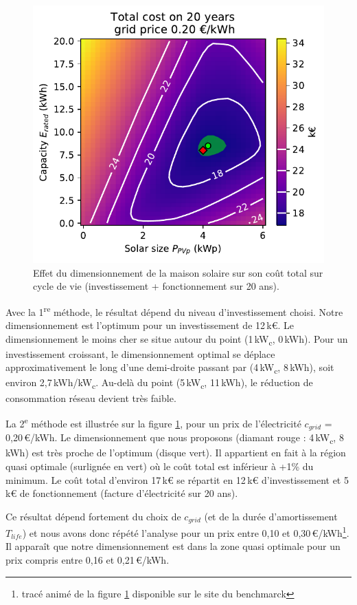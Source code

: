 \documentclass[a4paper,10pt,twocolumn]{article}
\newcommand\tsp[1]{\textsuperscript{#1}}
\newcommand\sub[1]{\textsubscript{#1}}
\newcommand\kWc{kW\sub{c}{}} %
\begin{document}
\begin{figure}[!ht]
  \begin{center}
	  \includegraphics[width=0.8\columnwidth]{figures/Total_cost_map_grid020.pdf}
  \end{center}

  \caption{Effet du dimensionnement de la maison solaire sur son coût total sur cycle de vie
  (investissement + fonctionnement sur 20 ans).
  }
  \label{fig:cost_tot}
\end{figure}

Avec la 1\tsp{re} méthode, le résultat dépend du niveau d'investissement choisi.
Notre dimensionnement est l'optimum pour un investissement de 12\,k€.
Le dimensionnement le moins cher se situe autour du point
(1\,\kWc, 0\,kWh). Pour un investissement croissant,
le dimensionnement optimal se déplace approximativement le long
d'une demi-droite passant par (4\,\kWc, 8\,kWh), soit environ
2,7\,kWh/\kWc.
Au-delà du point (5\,\kWc, 11\,kWh), le réduction de consommation réseau devient très faible.

La 2\tsp{e} méthode est illustrée sur la figure \ref{fig:cost_tot},
pour un prix de l'électricité $c_{grid}$ = 0,20\,€/kWh.
Le dimensionnement que nous proposons (diamant rouge : 4\,kW\sub{c}, 8\,kWh)
est très proche de l'optimum (disque vert).
Il appartient en fait à la région quasi optimale (surlignée en vert)
où le coût total est inférieur à +1\% du minimum.
Le coût total d'environ 17\,k€ se répartit en 12\,k€ d'investissement
et 5\,k€ de fonctionnement (facture d'électricité sur 20 ans).

Ce résultat dépend fortement du choix de $c_{grid}$
(et de la durée d'amortissement $T_{life}$)
et nous avons donc répété l'analyse pour un prix entre 0,10 et 0,30\,€/kWh\footnote{%
  tracé animé de la figure \ref{fig:cost_tot} disponible sur le site du benchmarck}.
Il apparaît que notre dimensionnement est dans la zone quasi optimale pour un prix
compris entre 0,16 et 0,21\,€/kWh.
\end{document}

